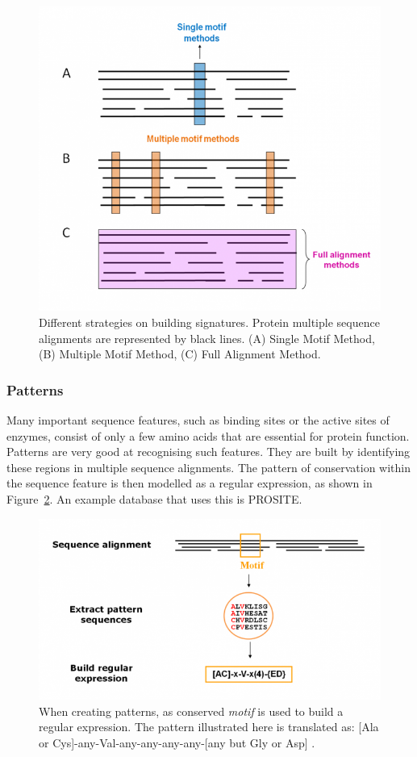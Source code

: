 \documentclass{article}
\begin{document}
\begin{figure}[h!]
\centering
\includegraphics[width=.75\textwidth]{motifmethods.png}
\caption{Different strategies on building signatures. Protein multiple sequence alignments are represented by black lines. (A) Single Motif Method, (B) Multiple Motif Method, (C) Full Alignment Method.}
\label{fig:motifmethods}
\end{figure}

\subsubsection*{Patterns}

Many important sequence features, such as binding sites or the active sites of enzymes, consist of only a few amino acids that are essential for protein function. Patterns are very good at recognising such features. They are built by identifying these regions in multiple sequence alignments. The pattern of conservation within the sequence feature is then modelled as a regular expression, as shown in Figure~\ref{fig:regex}. An example database that uses this is PROSITE.

\begin{figure}
\centering
\includegraphics[width=.75\textwidth]{regex.png}
\caption{When creating patterns, as conserved {\em motif} is used to build a regular expression. The pattern illustrated here is translated as: [Ala or Cys]-any-Val-any-any-any-any-[any but Gly or Asp] \cite{EBI}.}
\label{fig:regex}
\end{figure}
\end{document}
